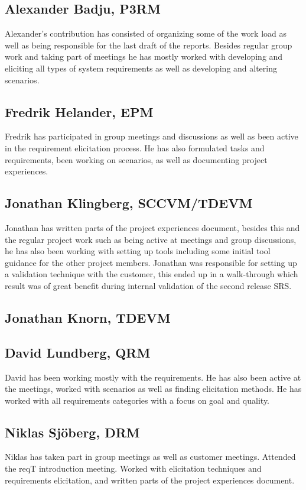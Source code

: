 \documentclass[10pt]{article}
\begin{document}
\subsection{Alexander Badju, P3RM}
Alexander's contribution has consisted of organizing some of the work load as well as being responsible for the last draft of the reports. Besides regular group work and taking part of meetings he has mostly worked with developing and eliciting all types of system requirements as well as developing and altering scenarios. 
\subsection{Fredrik Helander, EPM}
Fredrik has participated in group meetings and discussions as well as been active in the requirement elicitation process. He has also formulated tasks and requirements, been working on scenarios, as well as documenting project experiences.
\subsection{Jonathan Klingberg, SCCVM/TDEVM}
Jonathan has written parts of the project experiences document, besides this and the regular project work such as being active at meetings and group discussions, he has also been working with setting up tools including some initial tool guidance for the other project members.
Jonathan was responsible for setting up a validation technique with the customer, this ended up in a walk-through which result was of great benefit during internal validation of the second release SRS.
\subsection{Jonathan Knorn, TDEVM}

\subsection{David Lundberg, QRM}
David has been working mostly with the requirements. He has also been active at the meetings, worked with scenarios as well as finding elicitation methods. He has worked with all requirements categories with a focus on goal and quality. 
\subsection{Niklas Sjöberg, DRM}
Niklas has taken part in group meetings as well as customer meetings. Attended the reqT introduction meeting. Worked with elicitation techniques and requirements elicitation, and written parts of the project experiences document. 
\end{document}
